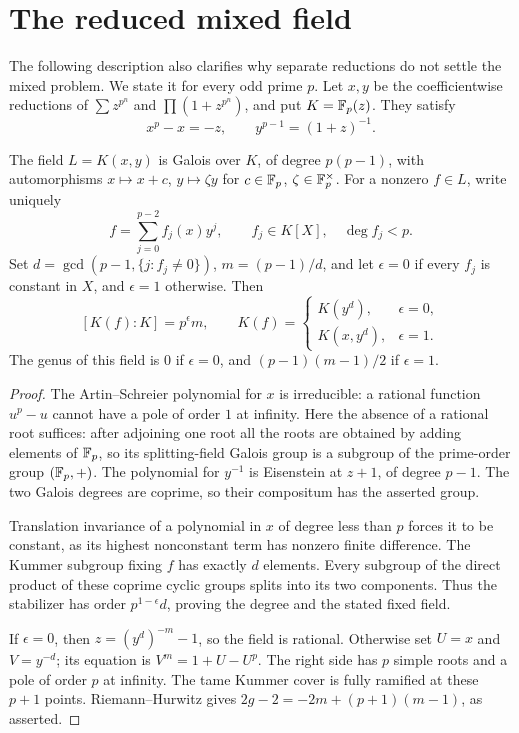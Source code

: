\section{The reduced mixed field}
\label{sec:reduced}

The following description also clarifies why separate reductions do not
settle the mixed problem. We state it for every odd prime $p$.
Let $x,y$ be the coefficientwise reductions of
$\sum z^{p^n}$ and $\prod(1+z^{p^n})$, and put $K=\mathbb F_p(z)$.
They satisfy
\begin{equation}\label{eq:charp}
 x^p-x=-z,\qquad y^{p-1}=(1+z)^{-1}.
\end{equation}

\begin{theorem}\label{thm:classification}
The field $L=K(x,y)$ is Galois over $K$, of degree $p(p-1)$, with
automorphisms $x\mapsto x+c$, $y\mapsto\zeta y$ for
$c\in\mathbb F_p$, $\zeta\in\mathbb F_p^\times$.
For a nonzero $f\in L$, write uniquely
\[
 f=\sum_{j=0}^{p-2} f_j(x)y^j,\qquad f_j\in K[X],\quad\deg f_j<p.
\]
Set $d=\gcd(p-1,\{j:f_j\ne0\})$, $m=(p-1)/d$, and let
$\epsilon=0$ if every $f_j$ is constant in $X$, and $\epsilon=1$ otherwise.
Then
\[
 [K(f):K]=p^\epsilon m,\qquad
 K(f)=\begin{cases}K(y^d),&\epsilon=0,\\K(x,y^d),&\epsilon=1.
 \end{cases}
\]
The genus of this field is $0$ if $\epsilon=0$, and
$(p-1)(m-1)/2$ if $\epsilon=1$.
\end{theorem}
\begin{proof}
The Artin--Schreier polynomial for $x$ is irreducible: a rational function
$u^p-u$ cannot have a pole of order $1$ at infinity. Here the absence
of a rational root suffices: after adjoining one root all the roots
are obtained by adding elements of $\mathbb F_p$, so its splitting-field
Galois group is a subgroup of the prime-order group $(\mathbb F_p,+)$.
The polynomial
for $y^{-1}$ is Eisenstein at $z+1$, of degree $p-1$. The two Galois
degrees are coprime, so their compositum has the asserted group.

Translation invariance of a polynomial in $x$ of degree less than $p$
forces it to be constant, as its highest nonconstant term has nonzero
finite difference. The Kummer subgroup fixing $f$ has exactly $d$
elements. Every subgroup of the direct product of these coprime cyclic
groups splits into its two components. Thus the stabilizer has order
$p^{1-\epsilon}d$, proving the degree and the stated fixed field.

If $\epsilon=0$, then $z=(y^d)^{-m}-1$, so the field is rational.
Otherwise set $U=x$ and $V=y^{-d}$; its equation is
$V^m=1+U-U^p$. The right side has $p$ simple roots and a pole of order
$p$ at infinity. The tame Kummer cover is fully ramified at these
$p+1$ points. Riemann--Hurwitz gives
$2g-2=-2m+(p+1)(m-1)$, as asserted.
\end{proof}


